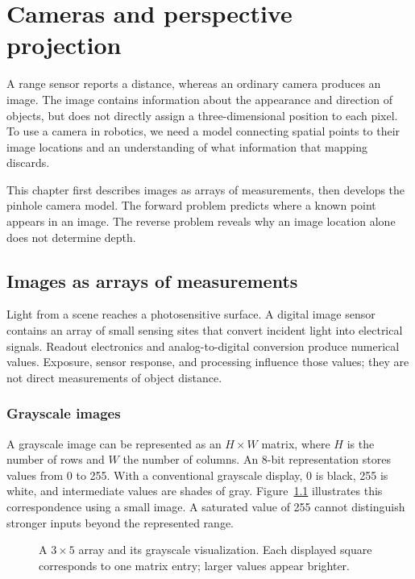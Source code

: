 \chapter{Cameras and perspective projection}
\label{chap:lecture07}

A range sensor reports a distance, whereas an ordinary camera produces an
image. The image contains information about the appearance and direction of
objects, but does not directly assign a three-dimensional position to each
pixel. To use a camera in robotics, we need a model connecting spatial points
to their image locations and an understanding of what information that mapping
discards.

This chapter first describes images as arrays of measurements, then develops
the pinhole camera model. The forward problem predicts where a known point
appears in an image. The reverse problem reveals why an image location alone
does not determine depth.

\section{Images as arrays of measurements}
Light from a scene reaches a photosensitive surface. A digital image sensor
contains an array of small sensing sites that convert incident light into
electrical signals. Readout electronics and analog-to-digital conversion
produce numerical values. Exposure, sensor response, and processing influence
those values; they are not direct measurements of object distance.

\subsection{Grayscale images}
A grayscale image can be represented as an $H\times W$ matrix, where $H$
is the number of rows and $W$ the number of columns. An 8-bit representation
stores values from 0 to 255. With a conventional grayscale display, 0 is
black, 255 is white, and intermediate values are shades of gray.
Figure~\ref{fig:l07-pixels} illustrates this correspondence using a small
image. A saturated value of 255 cannot distinguish stronger inputs beyond
the represented range.

\begin{figure}[htbp]
\centering
\caption{A $3\times5$ array and its grayscale visualization. Each displayed
square corresponds to one matrix entry; larger values appear brighter.}
\label{fig:l07-pixels}
\end{figure}

